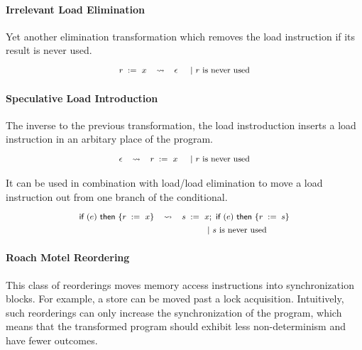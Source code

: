 \paragraph{Irrelevant Load Elimination}

Yet another elimination transformation 
which removes the load instruction if its 
result is never used. 
%
\[\def\arraystretch{1.4}\footnotesize
  \begin{array}{cccl} 

      \readInst{}{r}{x} 
    & \leadsto 
    & \epsInst
    & ~|~ \text{$r$ is never used}  \\ 

  \end{array}
\]

\paragraph{Speculative Load Introduction}

The inverse to the previous transformation, 
the load instroduction inserts a load instruction 
in an arbitary place of the program.
%
\[\def\arraystretch{1.4}\footnotesize
  \begin{array}{cccl} 

      \epsInst
    & \leadsto 
    & \readInst{}{r}{x} 
    & ~|~ \text{$r$ is never used}  \\ 

  \end{array}
\]

It can be used in combination with 
load/load elimination to move a load 
instruction out from one branch of 
the conditional.
%
\[\def\arraystretch{1.4}\footnotesize
  \begin{array}{ccc} 

      \kw{if} (e)~ \kw{then} \{ \readInst{}{r}{x} \}
    & \leadsto 
    & \readInst{}{s}{x} \seq \kw{if} (e)~ \kw{then} \{ \assignInst{r}{s} \} \\
    & & ~|~ \text{$s$ is never used}  \\ 

  \end{array}
\]

\paragraph{Roach Motel Reordering}

This class of reorderings moves memory access instructions
into synchronization blocks. For example, a store 
can be moved past a lock acquisition. 
Intuitively, such reorderings can only increase 
the synchronization of the program, 
which means that the transformed program should 
exhibit less non-determinism and have fewer outcomes. 

